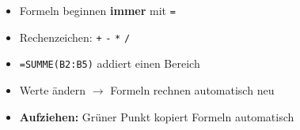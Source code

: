 \documentclass[11pt, a4paper]{article}
\begin{document}
\vspace{0.5em}

\begin{tcolorbox}[colback=hellgrau, colframe=fachfarbe, boxrule=1pt, arc=0pt, title={\textbf{Zusammenfassung}}, fonttitle=\bfseries\color{white}, coltitle=white, colbacktitle=fachfarbe]
\begin{itemize}[leftmargin=1.5em, itemsep=2pt]
    \item Formeln beginnen \textbf{immer} mit \texttt{=}
    \item Rechenzeichen: \texttt{+} \texttt{-} \texttt{*} \texttt{/}
    \item \texttt{=SUMME(B2:B5)} addiert einen Bereich
    \item Werte ändern $\rightarrow$ Formeln rechnen automatisch neu
    \item \textbf{Aufziehen:} Grüner Punkt kopiert Formeln automatisch
\end{itemize}
\end{tcolorbox}
\end{document}
